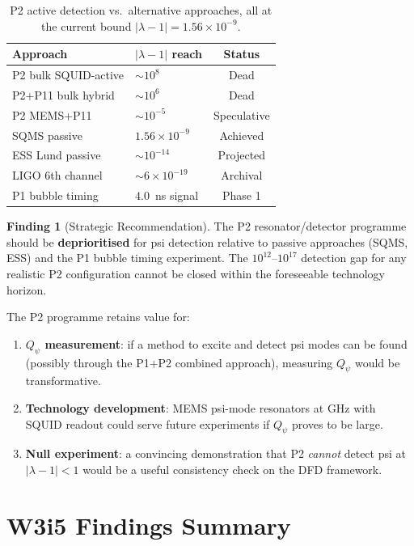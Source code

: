 \documentclass[11pt,twocolumn]{article}
\newcommand{\lam}{\lambda}
\newcommand{\ee}[1]{\times 10^{#1}}
\newcommand{\Qpsi}{Q_\psi}
\theoremstyle{definition}
\newtheorem{finding}[theorem]{Finding}
\theoremstyle{remark}
\begin{document}
\begin{table}[H]
\caption{P2 active detection vs.\ alternative approaches, all at the
current bound $|\lam-1| = 1.56\ee{-9}$.}
\label{tab:comparison}
\begin{tabular}{@{}p{3.5cm}p{2cm}c@{}}
\toprule
Approach & $|\lam-1|$ reach & Status \\
\midrule
P2 bulk SQUID-active & $\sim 10^8$ & Dead \\
P2+P11 bulk hybrid & $\sim 10^6$ & Dead \\
P2 MEMS+P11 & $\sim 10^{-5}$ & Speculative \\
SQMS passive & $1.56\ee{-9}$ & Achieved \\
ESS Lund passive & $\sim 10^{-14}$ & Projected \\
LIGO 6th channel & $\sim 6\ee{-19}$ & Archival \\
P1 bubble timing & $4.0$~ns signal & Phase 1 \\
\bottomrule
\end{tabular}
\end{table}

\begin{finding}[Strategic Recommendation]
\label{find:recommendation}
The P2 resonator/detector programme should be \textbf{deprioritised} for
psi detection relative to passive approaches (SQMS, ESS) and the P1
bubble timing experiment. The $10^{12}$--$10^{17}$ detection gap for
any realistic P2 configuration cannot be closed within the foreseeable
technology horizon.

The P2 programme retains value for:
\begin{enumerate}[nosep]
\item \textbf{$\Qpsi$ measurement}: if a method to excite and detect
  psi modes can be found (possibly through the P1+P2 combined approach),
  measuring $\Qpsi$ would be transformative.
\item \textbf{Technology development}: MEMS psi-mode resonators at GHz
  with SQUID readout could serve future experiments if $\Qpsi$ proves
  to be large.
\item \textbf{Null experiment}: a convincing demonstration that P2
  \emph{cannot} detect psi at $|\lam-1| < 1$ would be a useful
  consistency check on the DFD framework.
\end{enumerate}
\end{finding}

\section{W3i5 Findings Summary}
\label{sec:summary}
\end{document}

